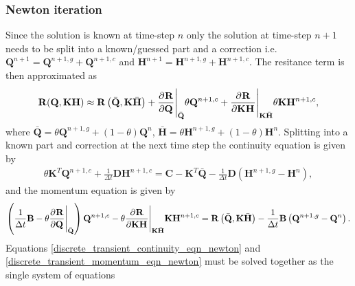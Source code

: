 \subsubsection{Newton iteration} 

Since the solution is known at time-step $n$ only the solution at time-step $n+1$ needs to be split into a known/guessed part and a correction i.e. $\mathbf{Q}^{n+1} = \mathbf{Q}^{n+1,g} + \mathbf{Q}^{n+1,c}$ and $\mathbf{H}^{n+1} = \mathbf{H}^{n+1,g} + \mathbf{H}^{n+1,c}$. The resitance term is then approximated as
\begin{align*}
\mathbf{R}(\mathbf{Q}, \mathbf{K} \mathbf{H}) \approx \mathbf{R}\left(\bar{\mathbf{Q}}, \mathbf{K} \bar{\mathbf{H}} \right) + \frac{\partial^{} \mathbf{R}}{\partial \mathbf{Q}^{}} \Bigg\vert_{\bar{\mathbf{Q}}} \theta \mathbf{Q}^{n+1,c} + \frac{\partial^{} \mathbf{R}}{\partial \mathbf{K} \mathbf{H}^{}} \Bigg\vert_{\mathbf{K} \bar{\mathbf{H}}} \theta \mathbf{K} \mathbf{H}^{n+1,c},
\end{align*}
where $\bar{\mathbf{Q}}=\theta \mathbf{Q}^{n+1,g} + (1-\theta) \mathbf{Q}^{n}$, $\bar{\mathbf{H}}=\theta \mathbf{H}^{n+1,g} + (1-\theta) \mathbf{H}^{n}$. Splitting into a known part and correction at the next time step the continuity equation is given by
\begin{align}\label{discrete_transient_continuity_eqn_newton}
\theta \mathbf{K}^T \mathbf{Q}^{n+1,c} + \frac{1}{\Delta t} \mathbf{D} \mathbf{H}^{n+1,c} = \mathbf{C} - \mathbf{K}^T \bar{\mathbf{Q}} - \frac{1}{\Delta t} \mathbf{D} \left( \mathbf{H}^{n+1,g} - \mathbf{H}^{n} \right),
\end{align}
and the momentum equation is given by
\begin{align}\label{discrete_transient_momentum_eqn_newton}
\left(\frac{1}{\Delta t} \mathbf{B} - \theta \frac{\partial^{} \mathbf{R}}{\partial \mathbf{Q}^{}} \Bigg\vert_{\bar{\mathbf{Q}}} \right) \mathbf{Q}^{n+1,c} - \theta \frac{\partial^{} \mathbf{R}}{\partial \mathbf{K} \mathbf{H}^{}} \Bigg\vert_{\mathbf{K} \bar{\mathbf{H}}} \mathbf{K} \mathbf{H}^{n+1,c} = \mathbf{R}\left(\bar{\mathbf{Q}}, \mathbf{K} \bar{\mathbf{H}} \right) - \frac{1}{\Delta t} \mathbf{B} \left(\mathbf{Q}^{n+1,g} - \mathbf{Q}^{n} \right).
\end{align} 
Equations \eqref{discrete_transient_continuity_eqn_newton} and \eqref{discrete_transient_momentum_eqn_newton} must be solved together as the single system of equations
